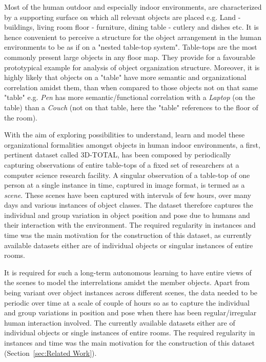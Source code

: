 \documentclass[letterpaper, 10 pt, conference]{ieeeconf}  %
\begin{document}
Most of the human outdoor and especially indoor environments, are characterized by a supporting surface on which all relevant objects are placed e.g. Land - buildings, living room floor - furniture, dining table - cutlery and dishes etc. It is hence convenient to perceive a structure for the object arrangement in the human environments to be as if on a "nested table-top system". Table-tops are the most commonly present large objects in any floor map. They provide for a favourable prototypical example for analysis of object organization structure. Moreover, it is highly likely that objects on a "table" have more semantic and organizational correlation amidst them, than when compared to those objects not on that same "table" e.g. \textit{Pen} has more semantic/functional correlation with a \textit{Laptop} (on the table) than a \textit{Couch} (not on that table, here the "table" references to the floor of the room).

With the aim of exploring possibilities to understand, learn and model these organizational formalities amongst objects in human indoor environments, a first, pertinent dataset called 3D-TOTAL, has been composed by periodically capturing observations of entire table-tops of a fixed set of researchers at a computer science research facility. A singular observation of a table-top of one person at a single instance in time, captured in image format, is termed as a \textit{scene}.
These scenes have been captured with intervals of few hours, over many days and various instances of object classes. The dataset therefore captures the individual and group variation in object position and pose due to humans and their interaction with the environment. The required regularity in instances and time was the main motivation for the construction of this dataset, as currently available datasets either are of individual objects or singular instances of entire rooms.

It is required for such a long-term autonomous learning to have entire views of the scenes to model the interrelations amidst the member objects. Apart from being variant over object instances across different scenes, the data needed to be periodic over time at a scale of couple of hours so as to capture the individual and group variations in position and pose when there has been regular/irregular human interaction involved. The currently available datasets either are of individual objects or single instances of entire rooms. The required regularity in instances and time was the main motivation for the construction of this dataset (Section~\ref{sec:Related Work}).
\end{document}
